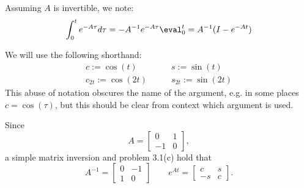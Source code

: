 \documentclass{homework}
\begin{document}
\newcommand{\conv}{\int_{0}^{t} e^{-A\tau} d\tau }
\newcommand{\convu}{\int_{0}^{t} e^{-A\tau} u(\tau) d\tau }

Assuming $A$ is invertible, we note:
\begin{equation}
    \conv = -A^{-1}e^{-A\tau} \eval_0^t = A^{-1} (I - e^{-At})
\end{equation}

We will use the following shorthand:
\begin{align*}
    c := \cos(t) &\qquad s := \sin(t) \\
    c_{2t} := \cos(2t) &\qquad s_{2t} := \sin(2t)
\end{align*}
This abuse of notation obscures the name of the argument,
e.g. in some places $c= \cos(\tau)$, but this should be
clear from context which argument is used.

Since
\begin{equation}
    A = \begin{bmatrix}
        0 & 1 \\ -1 & 0
    \end{bmatrix},
\end{equation}
a simple matrix inversion and problem 3.1(c) hold that
\begin{equation}
    A^{-1} = \begin{bmatrix}
        0 & -1 \\ 1 & 0
    \end{bmatrix} \qquad e^{At} = \begin{bmatrix}
        c & s \\ -s & c
    \end{bmatrix}.
\end{equation}
\end{document}
